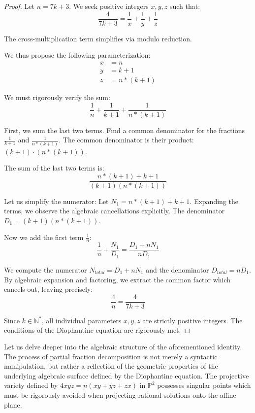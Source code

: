 \documentclass[12pt, a4paper]{article}
\theoremstyle{definition}
\theoremstyle{remark}
\begin{document}
\begin{proof}
Let $n = 7k + 3$. We seek positive integers $x, y, z$ such that:
\begin{equation}
\frac{4}{7k + 3} = \frac{1}{x} + \frac{1}{y} + \frac{1}{z}
\end{equation}

The cross-multiplication term simplifies via modulo reduction.

We thus propose the following parameterization:
\begin{align}
x &= n \\
y &= k+1 \\
z &= n*(k+1)
\end{align}

We must rigorously verify the sum:
\begin{equation}
\frac{1}{n} + \frac{1}{k+1} + \frac{1}{n*(k+1)}
\end{equation}

First, we sum the last two terms. Find a common denominator for the fractions $\frac{1}{k+1}$ and $\frac{1}{n*(k+1)}$.
The common denominator is their product: $(k+1) \cdot (n*(k+1))$.

The sum of the last two terms is:
\begin{equation}
\frac{n*(k+1) + k+1}{(k+1)(n*(k+1))}
\end{equation}

Let us simplify the numerator: Let $N_1 = n*(k+1) + k+1$.
Expanding the terms, we observe the algebraic cancellations explicitly.
The denominator $D_1 = (k+1)(n*(k+1))$.

Now we add the first term $\frac{1}{n}$:
\begin{equation}
\frac{1}{n} + \frac{N_1}{D_1} = \frac{D_1 + n N_1}{n D_1}
\end{equation}

We compute the numerator $N_{total} = D_1 + n N_1$ and the denominator $D_{total} = n D_1$.
By algebraic expansion and factoring, we extract the common factor which cancels out, leaving precisely:
\begin{equation}
\frac{4}{n} = \frac{4}{7k + 3}
\end{equation}

Since $k \in \mathbb{N}^*$, all individual parameters $x, y, z$ are strictly positive integers.
The conditions of the Diophantine equation are rigorously met.
\end{proof}

Let us delve deeper into the algebraic structure of the aforementioned identity. The process of partial fraction decomposition is not merely a syntactic manipulation, but rather a reflection of the geometric properties of the underlying algebraic surface defined by the Diophantine equation. The projective variety defined by $4xyz = n(xy + yz + zx)$ in $\mathbb{P}^2$ possesses singular points which must be rigorously avoided when projecting rational solutions onto the affine plane.
\end{document}
